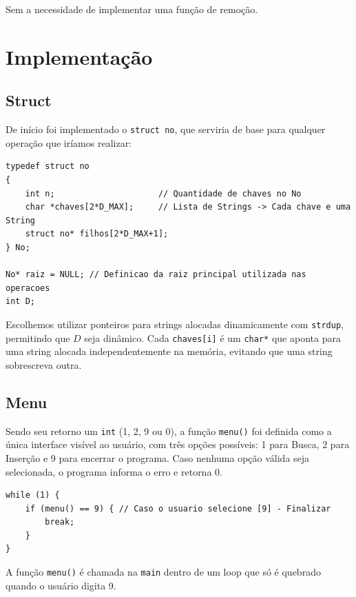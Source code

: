 \documentclass[12pt,a4paper]{article}
\begin{document}
Sem a necessidade de implementar uma função de remoção.

\section{Implementação}

\subsection{Struct}

De início foi implementado o \texttt{struct no}, que serviria de base para qualquer operação que iríamos realizar:

\begin{lstlisting}
typedef struct no
{
    int n;                     // Quantidade de chaves no No
    char *chaves[2*D_MAX];     // Lista de Strings -> Cada chave e uma String
    struct no* filhos[2*D_MAX+1];
} No;

No* raiz = NULL; // Definicao da raiz principal utilizada nas operacoes
int D;
\end{lstlisting}

Escolhemos utilizar ponteiros para strings alocadas dinamicamente com \texttt{strdup}, permitindo que $D$ seja dinâmico. Cada \texttt{chaves[i]} é um \texttt{char*} que aponta para uma string alocada independentemente na memória, evitando que uma string sobrescreva outra.

\subsection{Menu}

Sendo seu retorno um \texttt{int} (1, 2, 9 ou 0), a função \texttt{menu()} foi definida como a única interface visível ao usuário, com três opções possíveis: 1 para Busca, 2 para Inserção e 9 para encerrar o programa. Caso nenhuma opção válida seja selecionada, o programa informa o erro e retorna 0.

\begin{lstlisting}
while (1) {
    if (menu() == 9) { // Caso o usuario selecione [9] - Finalizar
        break;
    }
}
\end{lstlisting}

A função \texttt{menu()} é chamada na \texttt{main} dentro de um loop que só é quebrado quando o usuário digita 9.
\end{document}
